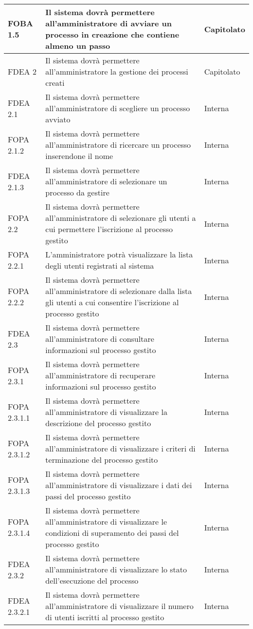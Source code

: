 \begin{longtable}{lXp{}}
\midrule
FOBA 1.5&Il sistema dovrà permettere all'amministratore di avviare un processo in creazione che contiene almeno un passo&Capitolato\\
\midrule
FDEA 2&Il sistema dovrà permettere all'amministratore la gestione dei processi creati&Capitolato\\
\midrule
FDEA 2.1&Il sistema dovrà permettere all'amministratore di scegliere un processo avviato&Interna\\
\midrule
FOPA 2.1.2&Il sistema dovrà permettere all'amministratore di ricercare un processo inserendone il nome&Interna\\
\midrule
FDEA 2.1.3&Il sistema dovrà permettere all'amministratore di selezionare un processo da gestire&Interna\\
\midrule
FOPA 2.2&Il sistema dovrà permettere all'amministratore di selezionare gli utenti a cui permettere l'iscrizione al processo gestito&Interna\\
\midrule
FOPA 2.2.1&L'amministratore potrà visualizzare la lista degli utenti registrati al sistema&Interna\\
\midrule
FOPA 2.2.2&Il sistema dovrà permettere all'amministratore di selezionare dalla lista gli utenti a cui consentire l'iscrizione al processo gestito&Interna\\
\midrule
FDEA 2.3&Il sistema dovrà permettere all'amministratore di consultare informazioni sul processo gestito&Interna\\
\midrule
FOPA 2.3.1&Il sistema dovrà permettere all'amministratore di recuperare informazioni sul processo gestito&Interna\\
\midrule
FOPA 2.3.1.1&Il sistema dovrà permettere all'amministratore di visualizzare la descrizione del processo gestito&Interna\\
\midrule
FOPA 2.3.1.2&Il sistema dovrà permettere all'amministratore di visualizzare i criteri di terminazione del processo gestito&Interna\\
\midrule
FOPA 2.3.1.3&Il sistema dovrà permettere all'amministratore di visualizzare i dati dei passi del processo gestito&Interna\\
\midrule
FOPA 2.3.1.4&Il sistema dovrà permettere all'amministratore di visualizzare le condizioni di superamento dei passi del processo gestito&Interna\\
\midrule
FDEA 2.3.2&Il sistema dovrà permettere all'amministratore di visualizzare lo stato dell'esecuzione del processo&Interna\\
\midrule
FDEA 2.3.2.1&Il sistema dovrà permettere all'amministratore di visualizzare il numero di utenti iscritti al processo gestito&Interna\\

\end{longtable}
